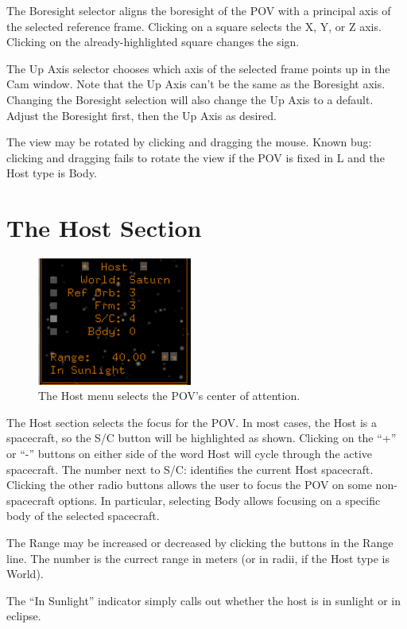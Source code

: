 \documentclass[12pt]{article}
\begin{document}
The Boresight selector aligns the boresight of the POV with a principal axis of the selected reference frame.  Clicking on a square selects the X, Y, or Z axis.  Clicking on the already-highlighted square changes the sign.

The Up Axis selector chooses which axis of the selected frame points up in the Cam window.  Note that the Up Axis can't be the same as the Boresight axis.  Changing the Boresight selection will also change the Up Axis to a default.  Adjust the Boresight first, then the Up Axis as desired.

The view may be rotated by clicking and dragging the mouse.  Known bug: clicking and dragging fails to rotate the view if the POV is fixed in L and the Host type is Body.

\section{The Host Section}

\begin{figure}[htb]
   \centering
   \includegraphics[width=2in]{Host.jpg} %
   \caption{The Host menu selects the POV's center of attention.}
   \label{fig:Host}
\end{figure}
The Host section selects the focus for the POV.  In most cases, the Host is a spacecraft, so the S/C button will be highlighted as shown.  Clicking on the ``+'' or ``-'' buttons on either side of the word Host will cycle through the active spacecraft.  The number next to S/C: identifies the current Host spacecraft.  Clicking the other radio buttons allows the user to focus the POV on some non-spacecraft options.  In particular, selecting Body allows focusing on a specific body of the selected spacecraft.

The Range may be increased or decreased by clicking the buttons in the Range line.  The number is the currect range in meters (or in radii, if the Host type is World).

The ``In Sunlight'' indicator simply calls out whether the host is in sunlight or in eclipse.
\end{document}
